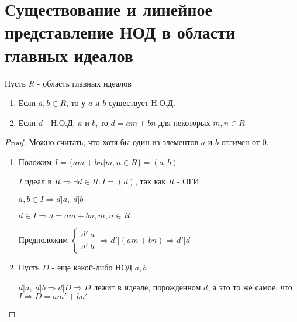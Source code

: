 \section{Существование и линейное представление НОД в области главных идеалов}
\begin{normalsize}
\begin{theorem-non}
    Пусть $R$ - область главных идеалов 

    \begin{enumerate}
        \item Если $a, b \in R$, то у $a$ и $b$ существует Н.О.Д.
        \item Если $d$ - Н.О.Д. $a$ и $b$, то $d = am + bn$ для некоторых $m, n \in R$
    \end{enumerate}
    \begin{proof}
        Можно считать, что хотя-бы один из элементов $a$ и $b$ отличен от $0$.
        \begin{enumerate}
            \item Положим $I = \{am + bn | m, n \in R\} = (a, b)$ 
            
            
            $I$ идеал в $R \Longrightarrow \exists d \in R : I = (d)$, так как $R$ - ОГИ  

            $a, b \in I \Longrightarrow d | a, \; d | b$

            $d \in I \Longrightarrow d = am + bn, m,n \in R$

            Предположим $\begin{cases}
                d' | a \\
                d' | b
            \end{cases} \Longrightarrow d' | (am + bn) \Longrightarrow d' | d$

            \item Пусть $D$ - еще какой-либо НОД $a, b$ 

            $d | a, \; d|b \Longrightarrow d | D \Longrightarrow D$ лежит в идеале, порожденном $d$, а это то же самое, что $I \Longrightarrow D = am' + bn'$ 
        \end{enumerate}
    \end{proof}
\end{theorem-non}
\end{normalsize}